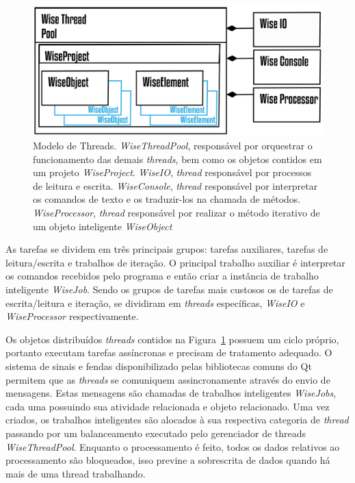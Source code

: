 \begin{figure}[!htbp]
	\centering
	\includegraphics[width=\linewidth]{Figures/WiseThreadPool@16x.png}
	\caption{Modelo de Threads. \textit{WiseThreadPool}, responsável por orquestrar o funcionamento das demais \textit{threads}, bem como os objetos contidos em um projeto \textit{WiseProject}. \textit{WiseIO}, \textit{thread} responsável por processos de leitura e escrita. \textit{WiseConsole}, \textit{thread} responsável por interpretar os comandos de texto e os traduzir-los na chamada de métodos. \textit{WiseProcessor}, \textit{thread} responsável por realizar o método iterativo de um objeto inteligente \textit{WiseObject}}
	\label{fig7:threads}
\end{figure}

As tarefas se dividem em três principais grupos: tarefas auxiliares, tarefas de leitura/escrita e trabalhos de iteração. O principal trabalho auxiliar é interpretar os comandos recebidos pelo programa e então criar a instância de trabalho inteligente \textit{WiseJob}. Sendo os grupos de tarefas mais custosos os de tarefas de escrita/leitura e iteração, se dividiram em \textit{threads} específicas, \textit{WiseIO} e \textit{WiseProcessor} respectivamente.

Os objetos distribuídos \textit{threads} contidos na Figura~\ref{fig7:threads} possuem um ciclo próprio, portanto executam tarefas assíncronas e precisam de tratamento adequado. O sistema de sinais e fendas disponibilizado pelas bibliotecas comuns do Qt permitem que as \textit{threads} se comuniquem assincronamente através do envio de mensagens. Estas mensagens são chamadas de trabalhos inteligentes \textit{WiseJobs}, cada uma possuindo sua atividade relacionada e objeto relacionado. Uma vez criados, os trabalhos inteligentes são alocados à sua respectiva categoria de \textit{thread} passando por um balanceamento executado pelo gerenciador de threads \textit{WiseThreadPool}. Enquanto o processamento é feito, todos os dados relativos ao processamento são bloqueados, isso previne a sobrescrita de dados quando há mais de uma thread trabalhando.

